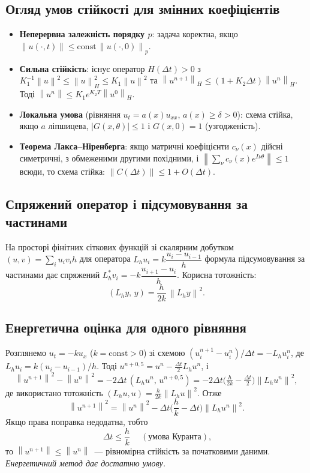 \documentclass[12pt,a4paper]{article}
\theoremstyle{definition}
\theoremstyle{plain}
\newcommand{\norm}[1]{\left\lVert #1 \right\rVert}
\newcommand{\abs}[1]{\left\lvert #1 \right\rvert}
\begin{document}
\subsection{Огляд умов стійкості для змінних коефіцієнтів}
\begin{itemize}[leftmargin=1.4em]
  \item \textbf{Неперервна залежність порядку $p$}: задача коректна, якщо
  $\norm{u(\cdot,t)}\le \mathrm{const}\,\norm{u(\cdot,0)}_p$.
  \item \textbf{Сильна стійкість}: існує оператор $H(\Delta t)>0$ з
  $K_1^{-1}\norm{u}^2\le\norm{u}_H^2\le K_1\norm{u}^2$ та
  $\norm{u^{n+1}}_H\le(1+K_2\Delta t)\norm{u^n}_H$. Тоді
  $\norm{u^n}\le K_1 e^{K_2 T}\norm{u^0}_H$.
  \item \textbf{Локальна умова} (рівняння $u_t=a(x)u_{xx}$, $a(x)\ge\delta>0$):
  схема стійка, якщо $a$ ліпшицева, $\abs{G(x,\theta)}\le1$ і
  $G(x,0)=1$ (узгодженість).
  \item \textbf{Теорема Лакса--Ніренберга}: якщо матричні коефіцієнти
  $c_\nu(x)$ дійсні симетричні, з обмеженими другими похідними, і
  $\norm{\sum_\nu c_\nu(x)e^{I\nu\theta}}\le1$ всюди, то схема стійка:
  $\norm{C(\Delta t)}\le1+O(\Delta t)$.
\end{itemize}

\subsection{Спряжений оператор і підсумовування за частинами}
На просторі фінітних сіткових функцій зі скалярним добутком
$(u,v)=\sum_i u_i v_i h$ для оператора
$L_h u_i=k\dfrac{u_i-u_{i-1}}{h}$ формула підсумовування за частинами дає
спряжений
$L_h^\ast v_i=-k\dfrac{u_{i+1}-u_i}{h}$. Корисна тотожність:
\begin{equation}
  (L_h y,\,y)=\frac{h}{2k}\,\norm{L_h y}^2 .
\end{equation}

\subsection{Енергетична оцінка для одного рівняння}
Розглянемо $u_t=-k u_x$ ($k=\mathrm{const}>0$) зі схемою
$(u_i^{n+1}-u_i^n)/\Delta t=-L_h u_i^n$, де
$L_h u_i=k(u_i-u_{i-1})/h$. Тоді
$u^{n+0,5}=u^n-\tfrac{\Delta t}{2}L_h u^n$, і
\[
  \norm{u^{n+1}}^2-\norm{u^n}^2
   =-2\Delta t\,(L_h u^n,\,u^{n+0,5})
   =-2\Delta t\Big(\tfrac{h}{2k}-\tfrac{\Delta t}{2}\Big)\norm{L_h u^n}^2,
\]
де використано тотожність $(L_h u,u)=\tfrac{h}{2k}\norm{L_h u}^2$. Отже
\begin{equation}
  \norm{u^{n+1}}^2=\norm{u^n}^2-\Delta t\Big(\frac{h}{k}-\Delta t\Big)\norm{L_h u^n}^2 .
\end{equation}
Якщо права поправка недодатна, тобто
\begin{equation}
  \boxed{\;\Delta t\le \frac{h}{k}\;}\quad(\text{умова Куранта}),
\end{equation}
то $\norm{u^{n+1}}\le\norm{u^n}$~--- рівномірна стійкість за початковими
даними. \emph{Енергетичний метод дає достатню умову.}
\end{document}
